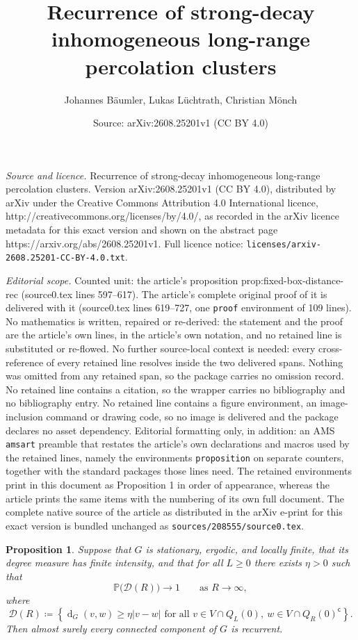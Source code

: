 \documentclass[10pt,a4paper]{amsart}
\title{Recurrence of strong-decay inhomogeneous long-range percolation clusters}
\author{Johannes B\"aumler, Lukas L\"uchtrath, Christian M\"onch}
\date{Source: arXiv:2608.25201v1 (CC BY 4.0)}
\newtheorem{proposition}{Proposition}
\renewcommand{\P}{\mathbb{P}}
\newcommand{\dG}{\operatorname{d}_{G}}
\begin{document}
\maketitle

\noindent\emph{Source and licence.} Recurrence of strong-decay inhomogeneous long-range percolation clusters. Version arXiv:2608.25201v1 (CC BY 4.0), distributed by arXiv under the Creative Commons Attribution 4.0 International licence, http://creativecommons.org/licenses/by/4.0/, as recorded in the arXiv licence metadata for this exact version and shown on the abstract page https://arxiv.org/abs/2608.25201v1. Full licence notice: \texttt{licenses/arxiv-2608.25201-CC-BY-4.0.txt}.\par\smallskip

\noindent\textit{Editorial scope.} Counted unit: the article's proposition prop:fixed-box-distance-rec (source0.tex lines 597--617). The article's complete original proof of it is delivered with it (source0.tex lines 619--727, one \texttt{proof} environment of 109 lines). No mathematics is written, repaired or re-derived: the statement and the proof are the article's own lines, in the article's own notation, and no retained line is substituted or re-flowed.  No further source-local context is needed: every cross-reference of every retained line resolves inside the two delivered spans.  Nothing was omitted from any retained span, so the package carries no omission record.  No retained line contains a citation, so the wrapper carries no bibliography and no bibliography entry.  No retained line contains a figure environment, an image-inclusion command or drawing code, so no image is delivered and the package declares no asset dependency.  Editorial formatting only, in addition: an AMS \texttt{amsart} preamble that restates the article's own declarations and macros used by the retained lines, namely the environments \texttt{proposition} on separate counters, together with the standard packages those lines need.  The retained environments print in this document as Proposition 1 in order of appearance, whereas the article prints the same items with the numbering of its own full document.  The complete native source of the article as distributed in the arXiv e-print for this exact version is bundled unchanged as \texttt{sources/208555/source0.tex}.
\begin{proposition}
\label{prop:fixed-box-distance-rec}
Suppose that \(G\) is stationary, ergodic, and locally finite, that its degree
measure has finite intensity, and that for all $L \geq 0$ there exists \(\eta>0\) such that
\begin{equation}
\label{eq:fixed-box-distance}
  \P\big(\mathcal D(R)\big)\longrightarrow1
  \qquad\text{as }R\to\infty,
\end{equation}
where
\[
  \mathcal D(R)\coloneqq 
  \left\{
    \dG(v,w)\ge\eta|v-w|
    \text{ for all }v\in V\cap Q_L(0),\
    w\in V\cap Q_R(0)^{\mathsf c}
  \right\}.
\]
Then almost surely every connected component of
\(G\) is recurrent.
\end{proposition}
\end{document}
